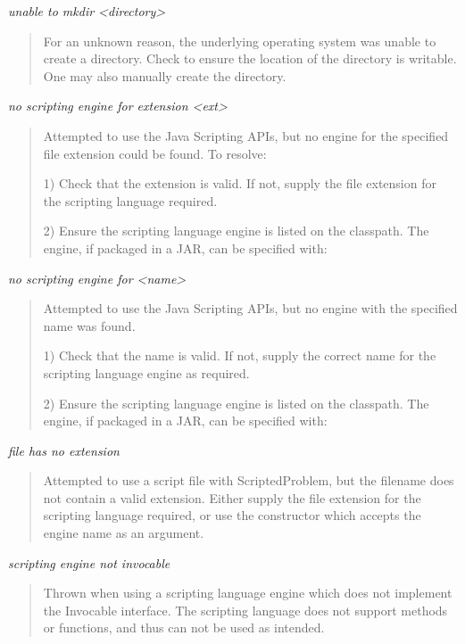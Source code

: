 \noindent
\textit{unable to mkdir <directory>}
\begin{quote}
  For an unknown reason, the underlying operating system was unable to create a directory.  Check to ensure the location of the directory is writable.  One may also manually create the directory.
\end{quote}
  
\noindent
\textit{no scripting engine for extension <ext>}
\begin{quote}
  Attempted to use the Java Scripting APIs, but no engine for the specified file extension could be found.  To resolve:
  
    1) Check that the extension is valid.  If not, supply the file extension for the scripting language required.
       
    2) Ensure the scripting language engine is listed on the classpath.  The engine, if packaged in a JAR, can be specified with:
\end{quote}

\noindent
\textit{no scripting engine for <name>}
\begin{quote}
  Attempted to use the Java Scripting APIs, but no engine with the specified name was found.
  
    1) Check that the name is valid.  If not, supply the correct name for the scripting language engine as required.
       
    2) Ensure the scripting language engine is listed on the classpath.  The engine, if packaged in a JAR, can be specified with:
\end{quote}

\noindent
\textit{file has no extension}
\begin{quote}
  Attempted to use a script file with ScriptedProblem, but the filename does not contain a valid extension.  Either supply the file extension for the scripting language required, or use the constructor which accepts the engine name as an argument.
\end{quote}

\noindent
\textit{scripting engine not invocable}
\begin{quote}
  Thrown when using a scripting language engine which does not implement the Invocable interface.  The scripting language does not support methods or functions, and thus can not be used as intended.
\end{quote}
  

